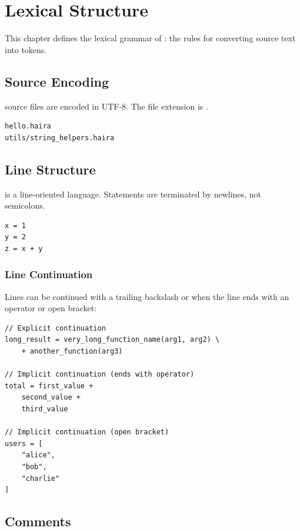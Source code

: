 \chapter{Lexical Structure}
\label{ch:lexical}

This chapter defines the lexical grammar of \haira{}: the rules for converting source text into tokens.

\section{Source Encoding}

\haira{} source files are encoded in UTF-8. The file extension is .

\begin{lstlisting}[language=bash,numbers=none]
hello.haira
utils/string_helpers.haira
\end{lstlisting}

\section{Line Structure}

\haira{} is a line-oriented language. Statements are terminated by newlines, not semicolons.

\begin{lstlisting}
x = 1
y = 2
z = x + y
\end{lstlisting}

\subsection{Line Continuation}

Lines can be continued with a trailing backslash or when the line ends with an operator or open bracket:

\begin{lstlisting}
// Explicit continuation
long_result = very_long_function_name(arg1, arg2) \
    + another_function(arg3)

// Implicit continuation (ends with operator)
total = first_value +
    second_value +
    third_value

// Implicit continuation (open bracket)
users = [
    "alice",
    "bob",
    "charlie"
]
\end{lstlisting}

\section{Comments}

